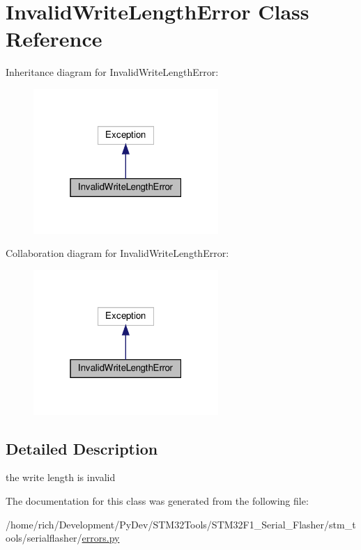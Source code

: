 \hypertarget{classstm__tools_1_1serialflasher_1_1errors_1_1InvalidWriteLengthError}{}\section{Invalid\+Write\+Length\+Error Class Reference}
\label{classstm__tools_1_1serialflasher_1_1errors_1_1InvalidWriteLengthError}


Inheritance diagram for Invalid\+Write\+Length\+Error\+:
\nopagebreak
\begin{figure}[H]
\begin{center}
\leavevmode
\includegraphics[width=199pt]{classstm__tools_1_1serialflasher_1_1errors_1_1InvalidWriteLengthError__inherit__graph}
\end{center}
\end{figure}


Collaboration diagram for Invalid\+Write\+Length\+Error\+:
\nopagebreak
\begin{figure}[H]
\begin{center}
\leavevmode
\includegraphics[width=199pt]{classstm__tools_1_1serialflasher_1_1errors_1_1InvalidWriteLengthError__coll__graph}
\end{center}
\end{figure}


\subsection{Detailed Description}
\begin{DoxyVerb}the write length is invalid\end{DoxyVerb}
 

The documentation for this class was generated from the following file\+:\begin{DoxyCompactItemize}
\item 
/home/rich/\+Development/\+Py\+Dev/\+S\+T\+M32\+Tools/\+S\+T\+M32\+F1\+\_\+\+Serial\+\_\+\+Flasher/stm\+\_\+tools/serialflasher/\hyperlink{errors_8py}{errors.\+py}\end{DoxyCompactItemize}
